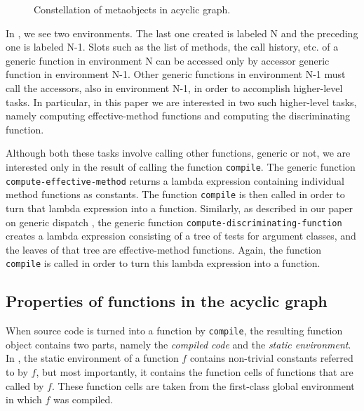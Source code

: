 \begin{figure}
\begin{center}
\end{center}
\caption{\label{fig-constellation}
Constellation of metaobjects in acyclic graph.}
\end{figure}

In , we see two environments.  The last one
created is labeled N and the preceding one is labeled N-1.  Slots such
as the list of methods, the call history, etc. of a generic function
in environment N can be accessed only by accessor generic function in
environment N-1.  Other generic functions in environment N-1 must call
the accessors, also in environment N-1, in order to accomplish
higher-level tasks.  In particular, in this paper we are interested in
two such higher-level tasks, namely computing effective-method
functions and computing the discriminating function.

Although both these tasks involve calling other functions, generic or
not, we are interested only in the result of calling the function
\texttt{compile}.  The generic function
\texttt{compute-effective-method} returns a lambda expression
containing individual method functions as constants.  The function
\texttt{compile} is then called in order to turn that lambda
expression into a function.  Similarly, as described in our paper on
generic dispatch \cite{Strandh:2014:FGD:2635648.2635654}, the generic
function \texttt{compute-discriminating-function} creates  a lambda
expression consisting of a tree of tests for argument classes, and the
leaves of that tree are effective-method functions.  Again, the
function \texttt{compile} is called in order to turn this lambda
expression into a function.

\subsection{Properties of functions in the acyclic graph}

When source code is turned into a function by \texttt{compile}, the
resulting function object contains two parts, namely the
\emph{compiled code} and the \emph{static environment}.  In \sicl{},
the static environment of a function $f$ contains non-trivial
constants referred to by $f$, but most importantly, it contains the
function cells of functions that are called by $f$.  These function
cells are taken from the first-class global environment in which $f$
was compiled.

